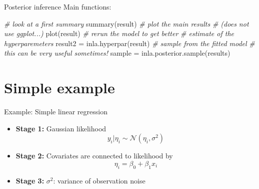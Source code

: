 \documentclass[
  ignorenonframetext,
]{beamer}
\newenvironment{Shaded}{\begin{snugshade}}{\end{snugshade}}
\newcommand{\CommentTok}[1]{\textcolor[rgb]{0.56,0.35,0.01}{\textit{#1}}}
\newcommand{\FunctionTok}[1]{\textcolor[rgb]{0.00,0.00,0.00}{#1}}
\newcommand{\NormalTok}[1]{#1}
\newcommand{\OtherTok}[1]{\textcolor[rgb]{0.56,0.35,0.01}{#1}}
\begin{document}
\begin{frame}[fragile]{Posterior inference}
\protect\hypertarget{posterior-inference}{}
Main functions:

\begin{Shaded}
\begin{Highlighting}[]
\CommentTok{\# look at a  first summary}
\FunctionTok{summary}\NormalTok{(result)}
\CommentTok{\# plot the main results}
\CommentTok{\# (does not use ggplot...)}
\FunctionTok{plot}\NormalTok{(result)}
\CommentTok{\# rerun the model to get better}
\CommentTok{\# estimate of the hyperparemeters}
\NormalTok{result2 }\OtherTok{=} \FunctionTok{inla.hyperpar}\NormalTok{(result)}
\CommentTok{\# sample from the fitted model}
\CommentTok{\# this can be very useful sometimes!}
\NormalTok{sample }\OtherTok{=} \FunctionTok{inla.posterior.sample}\NormalTok{(results)}
\end{Highlighting}
\end{Shaded}
\end{frame}

\hypertarget{simple-example}{%
\section{Simple example}\label{simple-example}}

\begin{frame}{Example: Simple linear regression}
\protect\hypertarget{example-simple-linear-regression}{}
\begin{itemize}
\item
  \textbf{Stage 1:} Gaussian likelihood \[
  y_i | \eta_i \sim \mathcal{N}(\eta_i, \sigma^2)
  \]
\item
  \textbf{Stage 2:} Covariates are connected to likelihood by \[
  \eta_i = \beta_0 + \beta_1 x_i
  \]
\item
  \textbf{Stage 3:} \(\sigma^2\): variance of observation noise
\end{itemize}
\end{frame}
\end{document}
